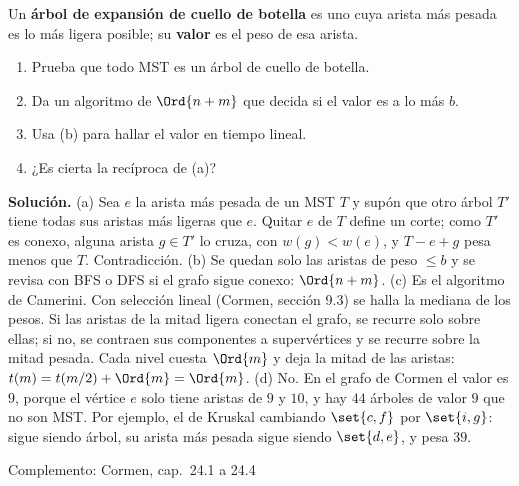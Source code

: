 \documentclass[11pt,letterpaper]{article}
\begin{document}
\begin{ejercicio}
  \label{ej:cuello-botella-mst}
  Un \textbf{árbol de expansión de cuello de botella} es uno cuya
  arista más pesada es lo más ligera posible; su \textbf{valor} es el
  peso de esa arista.
  \begin{enumerate}[label=(\alph*), itemsep=0.1em]
    \item Prueba que todo MST es un árbol de cuello de botella.
    \item Da un algoritmo de $\Ord{n + m}$ que decida si el valor es a
          lo más $b$.
    \item Usa (b) para hallar el valor en tiempo lineal.
    \item ¿Es cierta la recíproca de (a)?
  \end{enumerate}
\end{ejercicio}

\textbf{Solución.} (a) Sea $e$ la arista más pesada de un MST $T$ y
supón que otro árbol $T'$ tiene todas sus aristas más ligeras que $e$.
Quitar $e$ de $T$ define un corte; como $T'$ es conexo, alguna arista
$g \in T'$ lo cruza, con $w(g) < w(e)$, y $T - e + g$ pesa menos que
$T$. Contradicción. (b) Se quedan solo las aristas de peso $\le b$ y se
revisa con BFS o DFS si el grafo sigue conexo: $\Ord{n + m}$.
(c) Es el algoritmo de Camerini. Con selección lineal (Cormen, sección
9.3) se halla la mediana de los pesos. Si las aristas de la mitad
ligera conectan el grafo, se recurre solo sobre ellas; si no, se
contraen sus componentes a supervértices y se recurre sobre la mitad
pesada. Cada nivel cuesta $\Ord{m}$ y deja la mitad de las aristas:
$t(m) = t(m/2) + \Ord{m} = \Ord{m}$. (d) No. En el grafo de Cormen el
valor es $9$, porque el vértice $e$ solo tiene aristas de $9$ y $10$,
y hay $44$ árboles de valor $9$ que no son MST. Por ejemplo, el de
Kruskal cambiando $\set{c,f}$ por $\set{i,g}$: sigue siendo árbol, su
arista más pesada sigue siendo $\set{d,e}$, y pesa $39$.

\newpage


  {Complemento: Cormen, cap.\ 24.1 a 24.4}
\label{sec:caminos-fuente}
\end{document}
